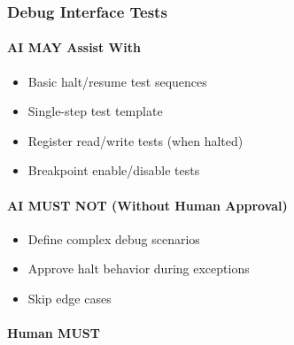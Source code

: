 \subsubsection{Debug Interface Tests}\label{cr:status:phase1-ai-human-responsibilities:debug-interface-tests}

\paragraph{\texorpdfstring{\ok{} AI MAY Assist
With}{ AI MAY Assist With}}\label{cr:status:phase1-ai-human-responsibilities:white-check-mark-ai-may-assist-with-15}

\begin{record}

\begin{itemize}
\tightlist
\item
  Basic halt/\allowbreak{}resume test sequences
\item
  Single-step test template
\item
  Register read/\allowbreak{}write tests (when halted)
\item
  Breakpoint enable/\allowbreak{}disable tests
\end{itemize}

\end{record}

\paragraph{\texorpdfstring{\warn{} AI MUST NOT (Without Human
Approval)}{ AI MUST NOT (Without Human Approval)}}\label{cr:status:phase1-ai-human-responsibilities:warning-ai-must-not-without-human-approval-15}

\begin{record}

\begin{itemize}
\tightlist
\item
  Define complex debug scenarios
\item
  Approve halt behavior during exceptions
\item
  Skip edge cases
\end{itemize}

\end{record}

\paragraph{\texorpdfstring{\hold{} Human MUST}{ Human MUST}}\label{cr:status:phase1-ai-human-responsibilities:raised-hand-human-must-15}

